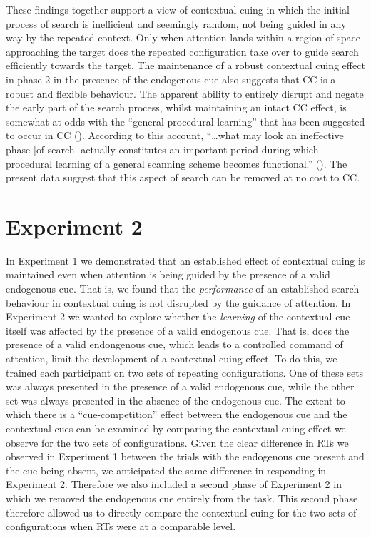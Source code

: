 \documentclass[
  man,
  floatsintext,
  longtable,
  nolmodern,
  notxfonts,
  notimes,
  colorlinks=true,linkcolor=blue,citecolor=blue,urlcolor=blue]{apa7}
\begin{document}
These findings together support a view of contextual cuing in which the
initial process of search is inefficient and seemingly random, not being
guided in any way by the repeated context. Only when attention lands
within a region of space approaching the target does the repeated
configuration take over to guide search efficiently towards the target.
The maintenance of a robust contextual cuing effect in phase 2 in the
presence of the endogenous cue also suggests that CC is a robust and
flexible behaviour. The apparent ability to entirely disrupt and negate
the early part of the search process, whilst maintaining an intact CC
effect, is somewhat at odds with the ``general procedural learning''
that has been suggested to occur in CC (). According to this account, ``\ldots what may look an
ineffective phase {[}of search{]} actually constitutes an important
period during which procedural learning of a general scanning scheme
becomes functional.'' (). The present data suggest that this aspect of search can be removed
at no cost to CC.

\section{Experiment 2}\label{experiment-2}

In Experiment 1 we demonstrated that an established effect of contextual
cuing is maintained even when attention is being guided by the presence
of a valid endogenous cue. That is, we found that the \emph{performance}
of an established search behaviour in contextual cuing is not disrupted
by the guidance of attention. In Experiment 2 we wanted to explore
whether the \emph{learning} of the contextual cue itself was affected by
the presence of a valid endogenous cue. That is, does the presence of a
valid endongenous cue, which leads to a controlled command of attention,
limit the development of a contextual cuing effect. To do this, we
trained each participant on two sets of repeating configurations. One of
these sets was always presented in the presence of a valid endogenous
cue, while the other set was always presented in the absence of the
endogenous cue. The extent to which there is a ``cue-competition''
effect between the endogenous cue and the contextual cues can be
examined by comparing the contextual cuing effect we observe for the two
sets of configurations. Given the clear difference in RTs we observed in
Experiment 1 between the trials with the endogenous cue present and the
cue being absent, we anticipated the same difference in responding in
Experiment 2. Therefore we also included a second phase of Experiment 2
in which we removed the endogenous cue entirely from the task. This
second phase therefore allowed us to directly compare the contextual
cuing for the two sets of configurations when RTs were at a comparable
level.
\end{document}

